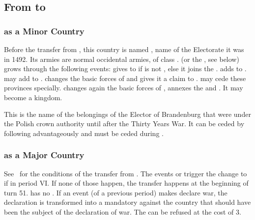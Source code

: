 \label{chSpecific:Prussia}
\subsection{From  to }
\subsubsection{ as a Minor Country}
\aparag Before the transfer from , this country is
named , name of the \HRE Electorate it was in 1492. Its armies
are normal occidental armies, of class \CAIII.
\aparag {} (or the , see below)
grows through the following events:
\bparag {} gives  to
 if \POL is not , else it joins the
.
\bparag {} adds  to
.
\bparag {} may add  to
.
\bparag {} changes the basic forces of
 and gives it a claim to . \POL may cede these provinces specially.
\bparag {} changes again the basic forces of
, annexes the  and
. It may become a kingdom.

 This is the name of the
belongings of the Elector of Brandenburg that were under the Polish
crown authority until after the Thirty Years War. It can be ceded by
\POL following  advantageously and must be
ceded during .

\subsubsection{ as a Major Country}
\aparag See~ for the conditions of
the transfer from .
\bparag The events  or 
trigger the change to  if in period VI. 
If none of those happen, the transfer happens at the beginning of turn 51.
\aparag \PRU has no \CTZ. 
\aparag If an event (of a previous period) makes 
declare war, the declaration is transformed into a mandatory \CB against
the country that should have been the subject of the declaration of
war. The \CB can be refused at the cost of 3\STAB.
